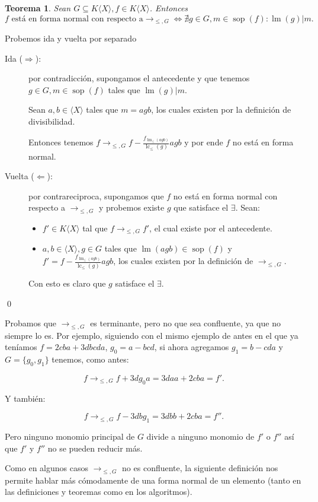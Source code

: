 \documentclass[12pt]{report}
\theoremstyle{customstyle}
\newtheorem{theorem}{Teorema}[chapter]
\renewenvironment{proof}[1][\proofname]{{\noindent \bfseries #1: }}{\qed} %
\theoremstyle{factstyle}
\DeclareMathOperator{\sop}{sop}
\DeclareMathOperator{\lm}{lm}
\DeclareMathOperator{\lc}{lc}
\begin{document}
\begin{theorem}
  Sean $G ⊆ K⟨X⟩, f ∈ K⟨X⟩$. Entonces
  \[ f\text{ está en forma normal con respecto a} →_{≤, G} ⇔ ∄g ∈ G, m ∈ \sop(f) : \lm(g) | m \text{.}\]
\end{theorem}
\begin{proof} Probemos ida y vuelta por separado
  \begin{description}
    \item[Ida ($⇒$):] por contradicción, supongamos el antecedente y que tenemos $g ∈ G, m ∈ \sop(f)$ tales que $\lm(g) | m$.

    \noindent Sean $a, b ∈ ⟨X⟩$ tales que $m = agb$, los cuales existen por la definición de divisibilidad.

    \noindent Entonces tenemos $f →_{≤, G} f - \frac{f_{\lm_≤(agb)}}{\lc_≤(g)}agb$ y por ende $f$ no está en forma normal.

    \item[Vuelta ($⇐$):] por contrareciproca, supongamos que $f$ no está en forma normal con respecto a $→_{≤, G}$ y probemos existe $g$ que satisface el $∃$. Sean:
    \begin{itemize}
      \item $f' ∈ K⟨X⟩$ tal que $f →_{≤, G} f'$, el cual existe por el antecedente.
      \item $a, b ∈ ⟨X⟩, g ∈ G$ tales que $\lm(agb) ∈ \sop(f)$ y $f' = f - \frac{f_{\lm_≤(agb)}}{\lc_≤(g)}agb$, los cuales existen por la definición de $→_{≤, G}$.
    \end{itemize}

    Con esto es claro que $g$ satisface el $∃$.
  \end{description}
\end{proof}

Probamos que $→_{≤, G}$ es terminante, pero no que sea confluente, ya que no siempre lo es. Por ejemplo, siguiendo con el mismo ejemplo de antes en el que ya teníamos $f = 2 cba + 3 dbcda$, $g_0 = a - bcd$, si ahora agregamos $g_1 = b - cda$ y $G = \{g_0, g_1\}$ tenemos, como antes:

\[f →_{≤, G} f + 3d g_0 a = 3 daa + 2 cba = f' \text{.}\]

\noindent Y también:

\[f →_{≤, G} f - 3db g_1 = 3 dbb + 2 cba = f'' \text{.}\]

\noindent Pero ninguno monomio principal de $G$ divide a ninguno monomio de $f'$ o $f''$ así que $f'$ y $f''$ no se pueden reducir más.

Como en algunos casos $→_{≤, G}$ no es confluente, la siguiente definición nos permite hablar más cómodamente de una forma normal de un elemento (tanto en las definiciones y teoremas como en los algoritmos).
\end{document}
